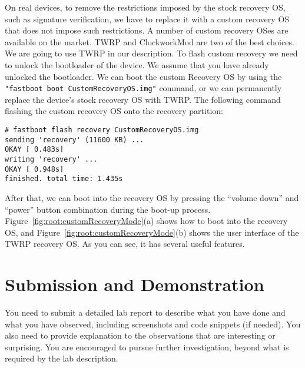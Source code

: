 On real devices, to remove the restrictions imposed by the stock
recovery OS, such as signature verification, we have to replace it with 
a custom recovery OS that does not impose such restrictions. 
A number of custom recovery OSes are available on the market. TWRP and
ClockworkMod are two of the best choices. 
We are going to use TWRP in our description. 
To flash custom recovery we need to unlock the
bootloader of the device. We assume that you have already unlocked the
bootloader. We can boot the custom Recovery OS by using
the \texttt{"fastboot boot CustomRecoveryOS.img"} command, or we can
permanently replace the device's stock recovery OS with TWRP. The following 
command flashing the custom recovery OS onto the recovery partition:


\begin{lstlisting}[frame=single, caption={}, label=label]
# fastboot flash recovery CustomRecoveryOS.img
sending 'recovery' (11600 KB) ...
OKAY [ 0.483s]
writing 'recovery' ...
OKAY [ 0.948s]
finished. total time: 1.435s
\end{lstlisting}

After that, we can boot into the recovery OS by 
pressing the ``volume down'' and ``power'' button combination during the boot-up process. 
Figure~\ref{fig:root:customRecoveryMode}(a) shows how to boot into the recovery OS, and 
Figure~\ref{fig:root:customRecoveryMode}(b) shows the user interface of the TWRP recovery OS.
As you can see, it has several useful features. 



\section{Submission and Demonstration}

You need to submit a detailed lab report to describe what you have done and
what you have observed, including screenshots and code snippets (if
needed). You also need to provide explanation to the observations that are
interesting or surprising. You are encouraged to pursue further
investigation, beyond what is required by the lab description.




